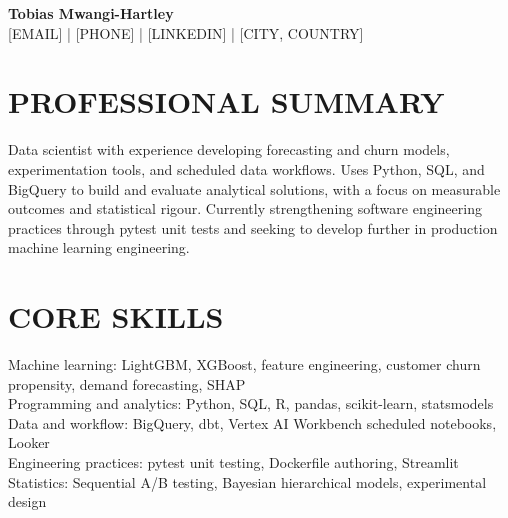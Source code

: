 \documentclass[11pt,a4paper]{article}
\begin{document}
\begin{center}
{\Huge\bfseries\color{primarycolor} Tobias Mwangi-Hartley}\\[0.35em]
[EMAIL] | [PHONE] | [LINKEDIN] | [CITY, COUNTRY]
\end{center}
\section*{PROFESSIONAL SUMMARY}
Data scientist with experience developing forecasting and churn models, experimentation tools, and scheduled data workflows. Uses Python, SQL, and BigQuery to build and evaluate analytical solutions, with a focus on measurable outcomes and statistical rigour. Currently strengthening software engineering practices through pytest unit tests and seeking to develop further in production machine learning engineering.
\section*{CORE SKILLS}
Machine learning: LightGBM, XGBoost, feature engineering, customer churn propensity, demand forecasting, SHAP\\
Programming and analytics: Python, SQL, R, pandas, scikit-learn, statsmodels\\
Data and workflow: BigQuery, dbt, Vertex AI Workbench scheduled notebooks, Looker\\
Engineering practices: pytest unit testing, Dockerfile authoring, Streamlit\\
Statistics: Sequential A/B testing, Bayesian hierarchical models, experimental design
\end{document}
